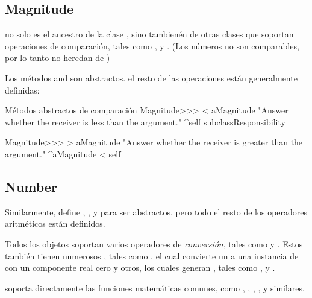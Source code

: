 \documentclass[a4paper,10pt,twoside]{book}
\begin{document}
\subsection{Magnitude}

 no solo es el ancestro de la clase , sino tambien\'en de otras clases que soportan operaciones de comparaci\'on, tales como  ,  y .  (Los n\'umeros  no son comparables, por lo tanto no heredan de )

Los m\'etodos  and  son abstractos. el resto de las operaciones est\'an generalmente definidas:

\begin{method}{M\'etodos abstractos de comparaci\'on}
Magnitude>>> < aMagnitude 
    "Answer whether the receiver is less than the argument."
    ^self subclassResponsibility

Magnitude>>> > aMagnitude 
    "Answer whether the receiver is greater than the argument."
    ^aMagnitude < self
\end{method}


\subsection{Number}

Similarmente,  define , ,  y  para ser abstractos, pero todo el resto de los operadores aritm\'eticos est\'an definidos.

Todos los objetos  soportan varios operadores de  \emph{conversi\'on}, tales como   y . Estos tambi\'en tienen numerosos , tales como , el cual convierte un  a una instancia de  con un componente real cero y otros, los cuales generan , tales como ,  y .

 soporta directamente las funciones matem\'aticas comunes, como , , , ,  y similares.
\end{document}
